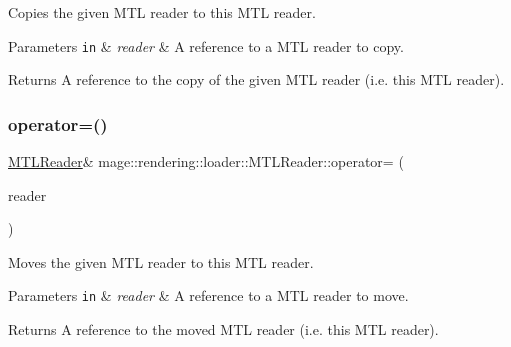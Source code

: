 Copies the given M\+TL reader to this M\+TL reader.


\begin{DoxyParams}[1]{Parameters}
\mbox{\tt in}  & {\em reader} & A reference to a M\+TL reader to copy. \\
\hline
\end{DoxyParams}
\begin{DoxyReturn}{Returns}
A reference to the copy of the given M\+TL reader (i.\+e. this M\+TL reader). 
\end{DoxyReturn}
\mbox{\label{classmage_1_1rendering_1_1loader_1_1_m_t_l_reader_a057f38f1f720e040b2ab5fa08f42fac4}} 
\subsubsection{\texorpdfstring{operator=()}{operator=()}\hspace{0.1cm}{\footnotesize\ttfamily [2/2]}}
{\footnotesize\ttfamily \mbox{\hyperlink{classmage_1_1rendering_1_1loader_1_1_m_t_l_reader}{M\+T\+L\+Reader}}\& mage\+::rendering\+::loader\+::\+M\+T\+L\+Reader\+::operator= (\begin{DoxyParamCaption}\item[{\mbox{\hyperlink{classmage_1_1rendering_1_1loader_1_1_m_t_l_reader}{M\+T\+L\+Reader}} \&\&}]{reader }\end{DoxyParamCaption})\hspace{0.3cm}{\ttfamily [delete]}}

Moves the given M\+TL reader to this M\+TL reader.


\begin{DoxyParams}[1]{Parameters}
\mbox{\tt in}  & {\em reader} & A reference to a M\+TL reader to move. \\
\hline
\end{DoxyParams}
\begin{DoxyReturn}{Returns}
A reference to the moved M\+TL reader (i.\+e. this M\+TL reader). 
\end{DoxyReturn}
\mbox{\label{classmage_1_1rendering_1_1loader_1_1_m_t_l_reader_ad4236487534d5dba6582613317317092}} 
